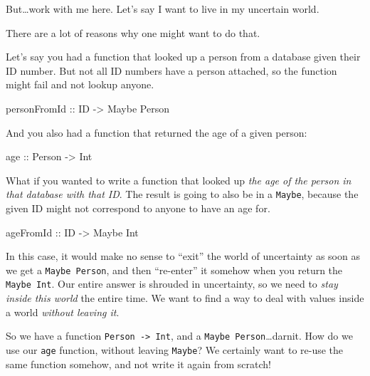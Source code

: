 \documentclass[]{article}
\newenvironment{Shaded}{}{}
\newcommand{\DataTypeTok}[1]{\textcolor[rgb]{0.56,0.13,0.00}{{#1}}}
\newcommand{\OtherTok}[1]{\textcolor[rgb]{0.00,0.44,0.13}{{#1}}}
\begin{document}
But\ldots{}work with me here. Let's say I want to live in my uncertain
world.

There are a lot of reasons why one might want to do that.

Let's say you had a function that looked up a person from a database
given their ID number. But not all ID numbers have a person attached, so
the function might fail and not lookup anyone.

\begin{Shaded}
\begin{Highlighting}[]
\OtherTok{personFromId ::} \DataTypeTok{ID} \OtherTok{->} \DataTypeTok{Maybe} \DataTypeTok{Person}
\end{Highlighting}
\end{Shaded}

And you also had a function that returned the age of a given person:

\begin{Shaded}
\begin{Highlighting}[]
\OtherTok{age ::} \DataTypeTok{Person} \OtherTok{->} \DataTypeTok{Int}
\end{Highlighting}
\end{Shaded}

What if you wanted to write a function that looked up \emph{the age of
the person in that database with that ID}. The result is going to also
be in a \texttt{Maybe}, because the given ID might not correspond to
anyone to have an age for.

\begin{Shaded}
\begin{Highlighting}[]
\OtherTok{ageFromId ::} \DataTypeTok{ID} \OtherTok{->} \DataTypeTok{Maybe} \DataTypeTok{Int}
\end{Highlighting}
\end{Shaded}

In this case, it would make no sense to ``exit'' the world of
uncertainty as soon as we get a \texttt{Maybe\ Person}, and then
``re-enter'' it somehow when you return the \texttt{Maybe\ Int}. Our
entire answer is shrouded in uncertainty, so we need to \emph{stay
inside this world} the entire time. We want to find a way to deal with
values inside a world \emph{without leaving it}.

So we have a function \texttt{Person\ -\textgreater{}\ Int}, and a
\texttt{Maybe\ Person}\ldots{}darnit. How do we use our \texttt{age}
function, without leaving \texttt{Maybe}? We certainly want to re-use
the same function somehow, and not write it again from scratch!
\end{document}
